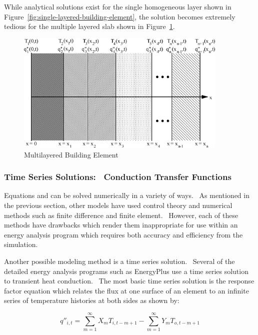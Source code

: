 While analytical solutions exist for the single homogeneous layer shown in Figure~\ref{fig:single-layered-building-element}, the solution becomes extremely tedious for the multiple layered slab shown in Figure~\ref{fig:multilayered-building-element}.

\begin{figure}[hbtp] %
\centering
\includegraphics[width=0.9\textwidth, height=0.9\textheight, keepaspectratio=true]{media/image5974.png}
\caption{Multilayered Building Element \protect \label{fig:multilayered-building-element}}
\end{figure}

\subsubsection{Time Series Solutions:~ Conduction Transfer Functions}\label{time-series-solutions-conduction-transfer-functions}

Equations and can be solved numerically in a variety of ways.~ As mentioned in the previous section, other models have used control theory and numerical methods such as finite difference and finite element.~ However, each of these methods have drawbacks which render them inappropriate for use within an energy analysis program which requires both accuracy and efficiency from the simulation.

Another possible modeling method is a time series solution.~ Several of the detailed energy analysis programs such as EnergyPlus use a time series solution to transient heat conduction.~ The most basic time series solution is the response factor equation which relates the flux at one surface of an element to an infinite series of temperature histories at both sides as shown by:

\begin{equation}
{q''_{i,t}} = \sum\limits_{m = 1}^\infty  {{X_m}{T_{i,t - m + 1}}}  - \sum\limits_{m = 1}^\infty  {{Y_m}{T_{o,t - m + 1}}}
\end{equation}

